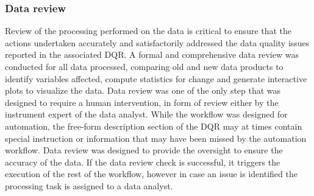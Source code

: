 \subsubsection{Data review}
Review of the processing performed on the data is critical to ensure
that the actions undertaken accurately and satisfactorily addressed the
data quality issues reported in the associated DQR.
A formal and comprehensive data review was conducted for all data
processed, comparing old and new data products to identify variables
affected, compute statistics for change and generate interactive plots
to visualize the data. Data review was one of the only step that was
designed to require a human intervention, in form of review either by
the instrument expert of the data analyst. While the workflow was
designed for automation, the free-form description section of the DQR
may at times contain special instruction or information that may have been missed by the
automation workflow. Data review was designed to provide the oversight
to ensure the accuracy of the data. If the data review check is
successful, it triggers the execution of the rest of the workflow,
however in case an issue is identified the processing task is
assigned to a data analyst. 




